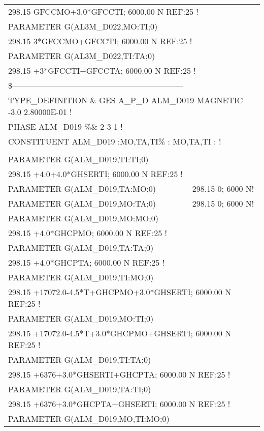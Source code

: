 \begin{longtable}[H]{ l l l }
	\multicolumn{3}{l}{298.15 GFCCMO+3.0*GFCCTI; 6000.00 N REF:25 !}\\	
	PARAMETER G(AL3M\_D022,MO:TI;0) & &\\
	\multicolumn{3}{l}{298.15 3*GFCCMO+GFCCTI; 6000.00 N REF:25 !}\\	  
	PARAMETER G(AL3M\_D022,TI:TA;0) & & \\
	\multicolumn{3}{l}{298.15 +3*GFCCTI+GFCCTA; 6000.00 N REF:25 !}\\
	\multicolumn{3}{l}{\$---------------------------------------------------------------}\\
	\multicolumn{3}{l}{TYPE\_DEFINITION \& GES A\_P\_D ALM\_D019 MAGNETIC  -3.0    2.80000E-01 !}\\
	\multicolumn{3}{l}{PHASE ALM\_D019  \%\&  2 3   1 !}\\
	\multicolumn{3}{l}{CONSTITUENT ALM\_D019  :MO,TA,TI\% : MO,TA,TI :  !}\\
	& & \\
	PARAMETER G(ALM\_D019,TI:TI;0) & &\\
	\multicolumn{3}{l}{298.15 +4.0+4.0*GHSERTI; 6000.00 N REF:25 !}\\
	PARAMETER G(ALM\_D019,TA:MO;0) & \multicolumn{2}{l}{298.15 0; 6000 N!}\\
	PARAMETER G(ALM\_D019,MO:TA;0) & \multicolumn{2}{l}{298.15 0; 6000 N!}\\ 
	PARAMETER G(ALM\_D019,MO:MO;0) & & \\
	\multicolumn{3}{l}{298.15 +4.0*GHCPMO; 6000.00 N REF:25 !}\\
	PARAMETER G(ALM\_D019,TA:TA;0) & & \\ 
	\multicolumn{3}{l}{298.15 +4.0*GHCPTA; 6000.00 N REF:25 !}\\
	PARAMETER G(ALM\_D019,TI:MO;0) & & \\
	\multicolumn{3}{l}{298.15 +17072.0-4.5*T+GHCPMO+3.0*GHSERTI;    6000.00 N REF:25 !}\\
	PARAMETER G(ALM\_D019,MO:TI;0) & & \\
	\multicolumn{3}{l}{298.15 +17072.0-4.5*T+3.0*GHCPMO+GHSERTI;    6000.00 N REF:25 !}\\
	PARAMETER G(ALM\_D019,TI:TA;0) & & \\
	\multicolumn{3}{l}{298.15 +6376+3.0*GHSERTI+GHCPTA; 6000.00 N REF:25 !}\\
	PARAMETER G(ALM\_D019,TA:TI;0) & & \\
	\multicolumn{3}{l}{298.15 +6376+3.0*GHCPTA+GHSERTI; 6000.00 N REF:25 !}\\
	PARAMETER G(ALM\_D019,MO,TI:MO;0) & & \\

\end{longtable}
